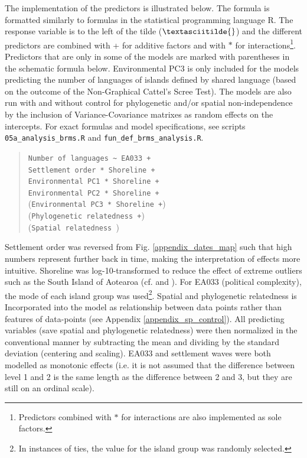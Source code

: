 \documentclass[unnumsec,webpdf,modern,medium]{oup-authoring-template}
\begin{document}
The implementation of the predictors is illustrated below. The formula is formatted similarly to formulas in the statistical programming language R. The response variable is to the left of the tilde ($\textasciitilde{}$) and the different predictors are combined with + for additive factors and with $\ast$ for interactions\footnote{Predictors combined with $\ast$ for interactions are also implemented as sole factors.}. Predictors that are only in some of the models are marked with parentheses in the schematic formula below. Environmental PC3 is only included for the models predicting the number of languages of islands defined by shared language (based on the outcome of the Non-Graphical Cattel's Scree Test). The models are also run with and without control for phylogenetic and/or spatial non-independence by the inclusion of Variance-Covariance matrixes as random effects on the intercepts. For exact formulas and model specifications, see scripts \texttt{05a\_analysis\_brms.R} and \texttt{fun\_def\_brms\_analysis.R}. 

\begin{quotation}
\texttt{Number of languages \textasciitilde{} EA033 +} \\
\indent \indent\texttt{Settlement order *  Shoreline +} \\
\indent \indent \texttt{Environmental PC1  *  Shoreline +} \\
\indent \indent\texttt{Environmental PC2  *  Shoreline +} \\
\indent \indent (\texttt{Environmental PC3 *  Shoreline +}) \\
\indent \indent (\texttt{Phylogenetic relatedness +}) \\
\indent \indent (\texttt{Spatial relatedness }) \\
\end{quotation}

Settlement order was reversed from Fig. \ref{appendix_dates_map} such that high numbers represent further back in time, making the interpretation of effects more intuitive. Shoreline was log-10-transformed to reduce the effect of extreme outliers such as the South Island of Aotearoa (cf. \citet{rolett2004environmental} and \citet{atkinson2016cultural}). For EA033 (political complexity), the mode of each island group was used\footnote{In instances of ties, the value for the island group was randomly selected.}. Spatial and phylogenetic relatedness is Incorporated into the model as relationship between data points rather than features of data-points (see Appendix \ref{appendix_sp_control}). All predicting variables (save spatial and phylogenetic relatedness) were then normalized in the conventional manner by subtracting the mean and dividing by the standard deviation (centering and scaling). EA033 and settlement waves were both modelled as monotonic effects (i.e. it is not assumed that the difference between level 1 and 2 is the same length as the difference between 2 and 3, but they are still on an ordinal scale).
\end{document}
